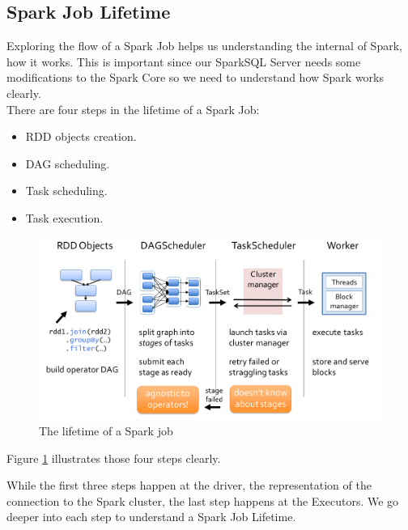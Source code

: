 \subsection{Spark Job Lifetime}
Exploring the flow of a Spark Job helps us understanding the internal of Spark, how it works. This is important since our SparkSQL Server needs some modifications to the Spark Core so we need to understand how Spark works clearly.\\
There are four steps in the lifetime of a Spark Job:
\begin{itemize}
\item RDD objects creation.
\item DAG scheduling.
\item Task scheduling.
\item Task execution.
\end{itemize}
\begin{figure}
\includegraphics[width=\textwidth]{Figures/spark-job-lifetime.jpeg}
\caption{The lifetime of a Spark job}
\label{fig:lifetime}
\end{figure}

Figure \ref{fig:lifetime} illustrates those four steps clearly.

While the first three steps happen at the driver, the representation of the connection to the Spark cluster, the last step happens at the Executors. We go deeper into each step to understand a Spark Job Lifetime.\\

